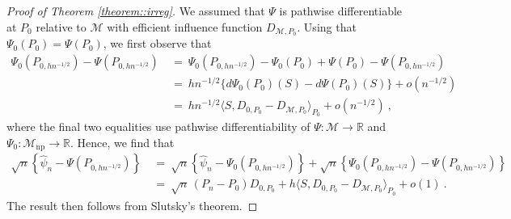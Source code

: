 \documentclass[11pt]{article}
\theoremstyle{definition}
\begin{document}
     
 \begin{proof}[Proof of Theorem \ref{theorem::irreg}]
 
      

     We assumed that $\Psi$ is pathwise differentiable at $P_0$ relative to $\mathcal{M}$ with efficient influence function $D_{\mathcal{M},P_0}$. Using that $\Psi_0(P_0) = \Psi(P_0)$, we first observe that 
     \begin{align*}
        \Psi_0(P_{0,hn^{-1/2}}) - \Psi(P_{0,hn^{-1/2}})\ &=\ \Psi_0(P_{0,hn^{-1/2}}) - \Psi_0(P_0)  + \Psi(P_0)- \Psi(P_{0,hn^{-1/2}})\\
         &=\ hn^{-1/2}\{ d\Psi_0(P_0)(S) - d\Psi(P_0)(S)\} + o(n^{-1/2})\\
          &=\ hn^{-1/2}\langle S, D_{0,P_0}- D_{\mathcal{M},P_0} \rangle_{P_0} + o(n^{-1/2})\ ,
     \end{align*}
where the final two equalities use pathwise differentiability of $\Psi:\mathcal{M} \rightarrow \mathbb{R}$ and $\Psi_0:\mathcal{M}_{\mathrm{np}} \rightarrow \mathbb{R}$. Hence, we find that
\begin{align*}
    \sqrt{n}\left\{\widehat{\psi}_n - \Psi(P_{0,hn^{-1/2}}) \right\}\ &=\ \sqrt{n}\left\{\widehat{\psi}_n  - \Psi_0(P_{0,hn^{-1/2}})\right\} + \sqrt{n}\left\{ \Psi_0(P_{0,hn^{-1/2}}) - \Psi(P_{0,hn^{-1/2}}) \right\} \\
   & =\ \sqrt{n}\,(P_n - P_0)D_{0,P_0} +  h\langle S, D_{0,P_0}- D_{\mathcal{M},P_0} \rangle_{P_0} + o(1)\ .
\end{align*} 
The result then follows from Slutsky's theorem.\end{proof}
 
\end{document}
